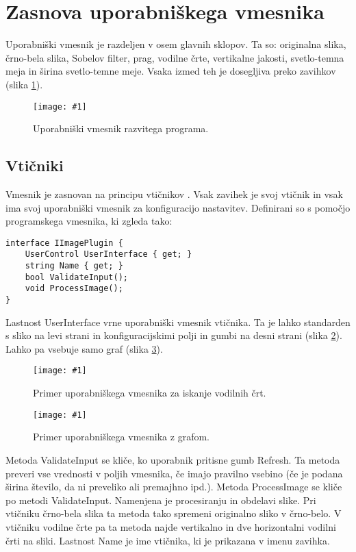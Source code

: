 \documentclass[oneside, a4paper, 12pt]{book}
\newcommand{\slika}[3]{
	\begin{figure}
	\begin{center}
	\texttt{[image: \#1]}
	\end{center}
	\vspace{-20pt}
	\caption{#2}
	\label{#3}
	\end{figure}
}
\begin{document}
\section{Zasnova uporabniškega vmesnika}
Uporabniški vmesnik je razdeljen v osem glavnih sklopov. Ta so: originalna slika, črno-bela slika, Sobelov filter, prag, vodilne črte, vertikalne jakosti, svetlo-temna meja in širina svetlo-temne meje. Vsaka izmed teh je dosegljiva preko zavihkov (slika \ref{pic:vmesnik1}).

\slika{slike/vmesnik-glavni.jpg}{Uporabniški vmesnik razvitega programa.}{pic:vmesnik1}

\subsection{Vtičniki}
Vmesnik je zasnovan na principu vtičnikov \cite{oreilly-dp, oreilly-cs}. Vsak zavihek je svoj vtičnik in vsak ima svoj uporabniški vmesnik za konfiguracijo nastavitev. Definirani so s pomočjo programskega vmesnika, ki zgleda tako:

\begin{samepage}
\begin{verbatim}
interface IImagePlugin {
    UserControl UserInterface { get; }
    string Name { get; }
    bool ValidateInput();
    void ProcessImage();
}
\end{verbatim}
\end{samepage}
Lastnost UserInterface vrne uporabniški vmesnik vtičnika. Ta je lahko standarden s sliko na levi strani in konfiguracijskimi polji in gumbi na desni strani (slika \ref{pic:vmesnik2}). Lahko pa vsebuje samo graf (slika \ref{pic:vmesnik3}).

\slika{slike/vmesnik-slika-konfiguracija.jpg}{Primer uporabniškega vmesnika za iskanje vodilnih črt.}{pic:vmesnik2}

\slika{slike/vmesnik-samo-graf.jpg}{Primer uporabniškega vmesnika z grafom.}{pic:vmesnik3}

Metoda ValidateInput se kliče, ko uporabnik pritisne gumb Refresh. Ta metoda preveri vse vrednosti v poljih vmesnika, če imajo pravilno vsebino (če je podana širina število, da ni preveliko ali premajhno ipd.). Metoda ProcessImage se kliče po metodi ValidateInput. Namenjena je procesiranju in obdelavi slike. Pri vtičniku črno-bela slika ta metoda tako spremeni originalno sliko v črno-belo. V vtičniku vodilne črte pa ta metoda najde vertikalno in dve horizontalni vodilni črti na sliki. Lastnost Name je ime vtičnika, ki je prikazana v imenu zavihka.
\end{document}
